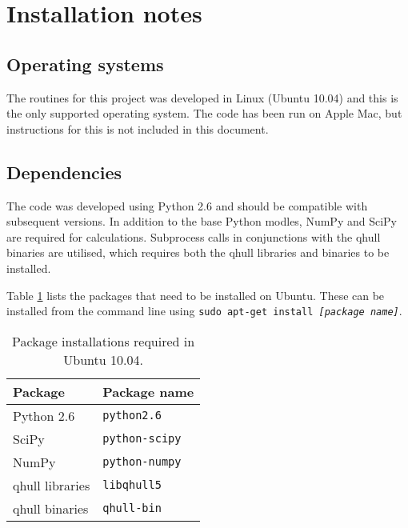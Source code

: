 \section{Installation notes}

\subsection{Operating systems}
The routines for this project was developed in Linux (Ubuntu 10.04) and this is the only supported operating system.
The code has been run on Apple Mac, but instructions for this is not included in this document.

\subsection{Dependencies}
The code was developed using Python 2.6 and should be compatible with subsequent versions.
In addition to the base Python modles, NumPy and SciPy are required for calculations.
Subprocess calls in conjunctions with the qhull binaries are utilised, which requires both the qhull libraries and binaries to be installed.

Table \ref{tab:installs} lists the packages that need to be installed on Ubuntu.
These can be installed from the command line using \texttt{sudo apt-get install {\it[package name]}}.

\begin{table}[htbp]
  \centering
  \begin{tabular}{ll}
    \toprule
    Package & Package name\\ 
    \midrule
	Python 2.6 & \texttt{python2.6}\\
	SciPy & \texttt{python-scipy}\\
	NumPy & \texttt{python-numpy}\\
	qhull libraries & \texttt{libqhull5}\\
	qhull binaries & \texttt{qhull-bin}\\
    \bottomrule
  \end{tabular}
  \caption{Package installations required in Ubuntu 10.04.}
  \label{tab:installs}
\end{table}

